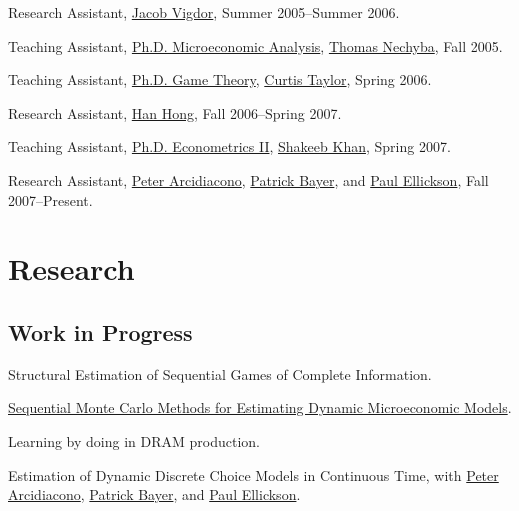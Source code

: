 \documentclass[letterpaper]{article}
\renewenvironment{itemize}{
  \begin{list}{}{
    \setlength{\leftmargin}{1em}
  }
}{
  \end{list}
}
\begin{document}
\begin{itemize}
\item Research Assistant,
  \href{http://trinity.aas.duke.edu/~jvigdor/}{Jacob Vigdor},
  Summer 2005--Summer 2006.
\item Teaching Assistant,
  \href{http://jblevins.org/courses/econ301f05}{Ph.D. Microeconomic Analysis},
  \href{http://www.econ.duke.edu/~nechyba/}{Thomas Nechyba},
  Fall 2005.
\item Teaching Assistant,
  \href{http://jblevins.org/courses/econ302s06}{Ph.D. Game Theory},
  \href{http://www.duke.edu/~crtaylor/}{Curtis Taylor},
  Spring 2006.
\item Research Assistant,
  \href{http://www.stanford.edu/~doubleh/}{Han Hong},
  Fall 2006--Spring 2007.
\item Teaching Assistant,
  \href{http://jblevins.org/courses/econ342s07}{Ph.D. Econometrics II},
  \href{http://www.econ.duke.edu/~shakeebk/}{Shakeeb Khan},
  Spring 2007.
\item Research Assistant,
  \href{http://www.econ.duke.edu/~psarcidi/}{Peter Arcidiacono},
  \href{http://www.econ.duke.edu/~pb29/}{Patrick Bayer}, and
  \href{http://www.econ.duke.edu/~paule/}{Paul Ellickson},
  Fall 2007--Present.
\end{itemize}


\section*{Research}

\subsection*{Work in Progress}

\begin{itemize}
\item Structural Estimation of Sequential Games of Complete Information.
\item \href{http://jblevins.org/research/smcdmm}{Sequential Monte Carlo
    Methods for Estimating Dynamic Microeconomic Models}.
\item Learning by doing in DRAM production.
\item Estimation of Dynamic Discrete Choice Models in Continuous
  Time, with
  \href{http://www.econ.duke.edu/~psarcidi/}{Peter Arcidiacono},
  \href{http://www.econ.duke.edu/~pb29/}{Patrick Bayer}, and
  \href{http://www.econ.duke.edu/~paule/}{Paul Ellickson}.
\end{itemize}
\end{document}
